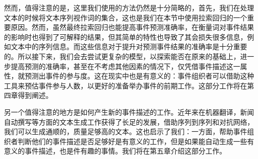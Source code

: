 然而，值得注意的是，这里我们使用的方法仍然是十分简略的，首先，我们在处理文本的时候将文本序列视作词的集合，这也是我们在本节中使用拉索回归的一个重要原因。然而，虽然最终拉索回归也能提高事件预测准确率，在衡量词对事件结果的影响时也得到了可解释的结果，但其简单的特性也导致了其会损失很多信息，例如文本中的序列信息。而这些信息对于提升对预测事件结果的准确率是十分重要的。所以接下来，我们会去尝试更复杂的模型，以探索能否在原来的基础上，进一步提高预测的准确率，甚至在不考虑其他因素的情况下，仅凭借事件描述这一属性，就预测出事件的参与度。这在现实中也是有意义的：事件组织者可以借助这种工具来预估事件参与人数，以更好的准备举办事件的前期工作。这部分工作将在第四章得到阐述。

另一个值得注意的地方是如何产生新的事件描述的工作。近年来在机器翻译，新闻自动撰写等方面的文本生成工作获得了长足的发展，借助序列到序列和对抗网络，我们可以生成通顺的，质量足够高的文本。这也启示了我们：一方面，帮助事件组织者判断他们的事件描述是否足够好是有意义的工作，但是如果能自动生成一些有意义的事件描述，也是件有趣的事情。我们将在第五章介绍这部分工作。

% 